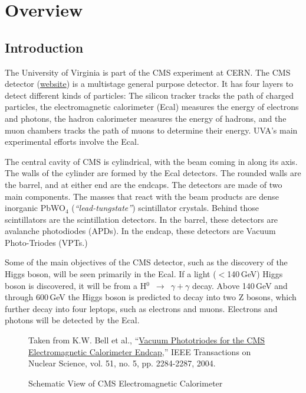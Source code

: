 
\chapter{Overview}
\label{sec:eq_intro}

\section{Introduction}
\label{sec:eq_intro:intro}

The University of Virginia is part of the CMS experiment at CERN.  The CMS detector (\href{http://cms.web.cern.ch/cms/Detector/FullDetector/index.html}{website}) is a multistage general purpose detector.  It has four layers to detect different kinds of particles: The silicon tracker tracks the path of charged particles, the electromagnetic calorimeter (Ecal) measures the energy of electrons and photons, the hadron calorimeter measures the energy of hadrons, and the muon chambers tracks the path of muons to determine their energy.  UVA's main experimental efforts involve the Ecal.

The central cavity of CMS is cylindrical, with the beam coming in along its axis.  The walls of the cylinder are formed by the Ecal detectors.  The rounded walls are the barrel, and at either end are the endcaps.  The detectors are made of two main components.  The masses that react with the beam products are dense inorganic PbWO$_4$ (\textit{``lead-tungstate''}) scintillator crystals.  Behind those scintillators are the scintillation detectors.  In the barrel, these detectors are avalanche photodiodes (APDs).  In the endcap, these detectors are Vacuum Photo-Triodes (VPTs.)

Some of the main objectives of the CMS detector, such as the discovery of the Higgs boson, will be seen primarily in the Ecal.  If a light ($<$140\,GeV) Higgs boson is discovered, it will be from a H$^0$~$\to$~$\gamma + \gamma$ decay.  Above 140\,GeV and through 600\,GeV the Higgs boson is predicted to decay into two Z bosons, which further decay into four leptops, such as electrons and muons.  Electrons and photons will be detected by the Ecal.

\begin{figure}[htbp]
  \centering
  \parbox{0.75\textwidth}{\tiny
    Taken from K.W. Bell et al., ``\href{papers/1344324}{Vacuum Phototriodes for the CMS Electromagnetic Calorimeter Endcap},'' IEEE Transactions on Nuclear Science, vol. 51, no. 5, pp. 2284-2287, 2004.}
  \caption{Schematic View of CMS Electromagnetic Calorimeter}
  \label{fig:eq_intro:ecal}
\end{figure}

